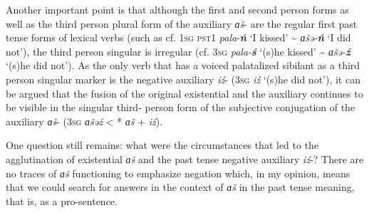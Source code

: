 \documentclass[output=paper]{langsci/langscibook}
\begin{document}
  Another important point is that although the first and second person forms as well as the third person plural form of the auxiliary \textit{ɑš}- are the regular first past tense forms of lexical verbs (such as cf. 1\textsc{sg} \textsc{pst1} \textit{pala}-\textbf{\textit{ń}} `I kissed' {\textasciitilde} \textit{ɑšə-}\textbf{\textit{ń}} `I did not'), the third person singular is irregular (cf. 3\textsc{sg} \textit{pala-}\textbf{\textit{ś}} `(s)he kissed' {\textasciitilde} \textit{ɑšə-}\textbf{\textit{ź}} `(s)he did not'). As the only verb that has a voiced palatalized sibilant as a third person singular marker is the negative auxiliary \textit{iź}- (3\textsc{sg} \textit{iź} `(s)he did not'), it can be argued that the fusion of the original existential and the auxiliary continues to be visible in the singular third- person form of the subjective conjugation of the auxiliary \textit{ɑš}- (3\textsc{sg} \textit{ɑšəź} < * \textit{ɑš} + \textit{iź}).

  One question still remains: what were the circumstances that led to the agglutination of existential \textit{ɑš} and the past tense negative auxiliary \textit{iź}-? There are no traces of \textit{ɑš} functioning to emphasize negation which, in my opinion, means that we could search for answers in the context of \textit{ɑš} in the past tense meaning, that is, as a pro-sentence.
\end{document}
